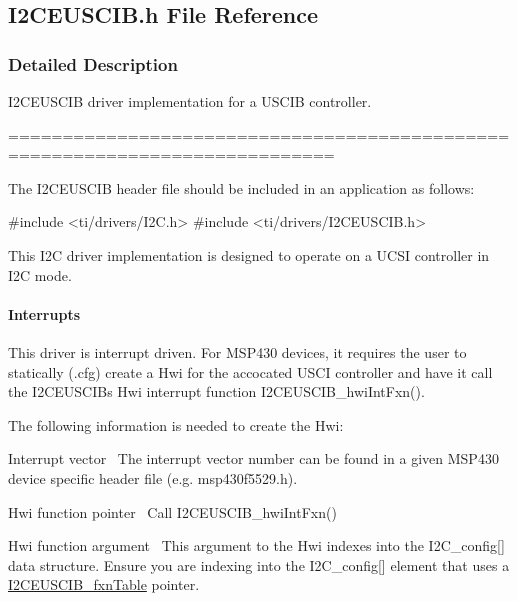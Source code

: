 \subsection{I2\+C\+E\+U\+S\+C\+I\+B.\+h File Reference}
\label{_i2_c_e_u_s_c_i_b_8h}


\subsubsection{Detailed Description}
I2\+C\+E\+U\+S\+C\+I\+B driver implementation for a U\+S\+C\+I\+B controller. 

============================================================================

The I2\+C\+E\+U\+S\+C\+I\+B header file should be included in an application as follows\+: 
\begin{DoxyCode}
\textcolor{preprocessor}{#include <ti/drivers/I2C.h>}
\textcolor{preprocessor}{#include <ti/drivers/I2CEUSCIB.h>}
\end{DoxyCode}


This I2\+C driver implementation is designed to operate on a U\+C\+S\+I controller in I2\+C mode.

\paragraph*{Interrupts}

This driver is interrupt driven. For M\+S\+P430 devices, it requires the user to statically (.cfg) create a Hwi for the accocated U\+S\+C\+I controller and have it call the I2\+C\+E\+U\+S\+C\+I\+B\textquotesingle{}s Hwi interrupt function I2\+C\+E\+U\+S\+C\+I\+B\+\_\+hwi\+Int\+Fxn().

The following information is needed to create the Hwi\+:
\begin{DoxyEnumerate}
\item Interrupt vector~\newline
 The interrupt vector number can be found in a given M\+S\+P430 device specific header file (e.\+g. msp430f5529.\+h).
\item Hwi function pointer~\newline
 Call I2\+C\+E\+U\+S\+C\+I\+B\+\_\+hwi\+Int\+Fxn()
\item Hwi function argument~\newline
 This argument to the Hwi indexes into the I2\+C\+\_\+config\mbox{[}\mbox{]} data structure. Ensure you are indexing into the I2\+C\+\_\+config\mbox{[}\mbox{]} element that uses a \hyperlink{_i2_c_e_u_s_c_i_b_8h_aabe3af9e77a2b8cc7cd82dd22618e406}{I2\+C\+E\+U\+S\+C\+I\+B\+\_\+fxn\+Table} pointer.
\end{DoxyEnumerate}


